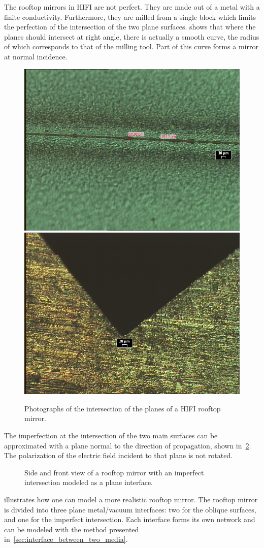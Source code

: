 \begin{refsection}
The rooftop mirrors in HIFI are not perfect.
They are made out of a metal with a finite conductivity.
Furthermore, they are milled from a single block which limits the perfection of the intersection of the two plane surfaces.
 shows that where the planes should intersect at right angle, there is actually a smooth curve, the radius of which corresponds to that of the milling tool.
Part of this curve forms a mirror at normal incidence.
\begin{figure}
    \centering
    \includegraphics[width=.5\textwidth]{rooftop_front}%
    \includegraphics[width=.5\textwidth]{rooftop_side}
    \caption{Photographs of the intersection of the planes of a HIFI rooftop mirror.}
    \label{fig:rooftop_photo}
\end{figure}

The imperfection at the intersection of the two main surfaces can be approximated with a plane normal to the direction of propagation, shown in~\cref{fig:rooftop_imperfect}.
The polarization of the electric field incident to that plane is not rotated.
\begin{figure}
    \centering
    
    \caption{Side and front view of a rooftop mirror with an imperfect intersection modeled as a plane interface.}
    \label{fig:rooftop_imperfect}
\end{figure}

 illustrates how one can model a more realistic rooftop mirror.
The rooftop mirror is divided into three plane metal/vacuum interfaces: two for the oblique surfaces, and one for the imperfect intersection.
Each interface forms its own network and can be modeled with the method presented in~\cref{sec:interface_between_two_media}.


\end{refsection}
